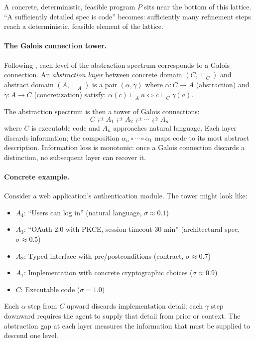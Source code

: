 \documentclass[11pt, a4paper, logo, copyright]{googledeepmind}
\begin{document}
A concrete, deterministic, feasible program $P$ sits near the bottom of this lattice. ``A sufficiently detailed spec is code'' becomes: sufficiently many refinement steps reach a deterministic, feasible element of the lattice.

\paragraph{The Galois connection tower.} Following \citet{cousot1977abstract}, each level of the abstraction spectrum corresponds to a Galois connection. An \emph{abstraction layer} between concrete domain $(C, \sqsubseteq_C)$ and abstract domain $(A, \sqsubseteq_A)$ is a pair $(\alpha, \gamma)$ where $\alpha: C \to A$ (abstraction) and $\gamma: A \to C$ (concretization) satisfy: $\alpha(c) \sqsubseteq_A a \iff c \sqsubseteq_C \gamma(a)$.

The abstraction spectrum is then a tower of Galois connections:
\begin{equation}
    C \rightleftarrows A_1 \rightleftarrows A_2 \rightleftarrows \cdots \rightleftarrows A_n
\end{equation}
where $C$ is executable code and $A_n$ approaches natural language. Each layer discards information; the composition $\alpha_n \circ \cdots \circ \alpha_1$ maps code to its most abstract description. Information loss is monotonic: once a Galois connection discards a distinction, no subsequent layer can recover it.

\paragraph{Concrete example.} Consider a web application's authentication module. The tower might look like:
\begin{itemize}[nosep]
    \item $A_4$: ``Users can log in'' (natural language, $\sigma \approx 0.1$)
    \item $A_3$: ``OAuth 2.0 with PKCE, session timeout 30 min'' (architectural spec, $\sigma \approx 0.5$)
    \item $A_2$: Typed interface with pre/postconditions (contract, $\sigma \approx 0.7$)
    \item $A_1$: Implementation with concrete cryptographic choices ($\sigma \approx 0.9$)
    \item $C$: Executable code ($\sigma = 1.0$)
\end{itemize}
Each $\alpha$ step from $C$ upward discards implementation detail; each $\gamma$ step downward requires the agent to supply that detail from prior or context. The abstraction gap at each layer measures the information that must be supplied to descend one level.
\end{document}
